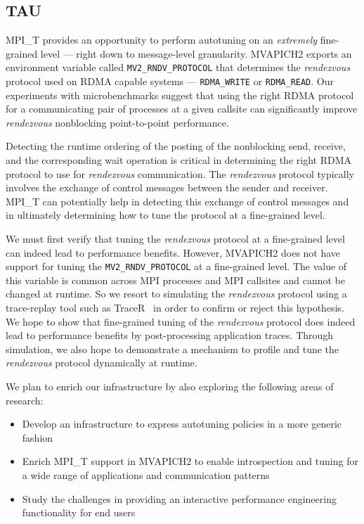 \subsection{TAU}
MPI\_T provides an opportunity to perform autotuning on an \textit{extremely} fine-grained level --- right down to message-level granularity. MVAPICH2 exports an environment variable called \verb+MV2_RNDV_PROTOCOL+ that determines the \textit{rendezvous} protocol used on RDMA capable systems --- \verb+RDMA_WRITE+ or \verb+RDMA_READ+. Our experiments with microbenchmarks suggest that using the right RDMA protocol for a communicating pair of processes at a given callsite can significantly improve \textit{rendezvous} nonblocking point-to-point performance. 
\par Detecting the runtime ordering of the posting of the nonblocking send, receive, and the corresponding wait operation is critical in determining the right RDMA protocol to use for \textit{rendezvous} communication. The \textit{rendezvous} protocol typically involves the exchange of control messages between the sender and receiver. MPI\_T can potentially help in detecting this exchange of control messages and in ultimately determining how to tune the protocol at a fine-grained level. 
\par We must first verify that tuning the \textit{rendezvous} protocol at a fine-grained level can indeed lead to performance benefits. However, MVAPICH2 does not have support for tuning the \verb+MV2_RNDV_PROTOCOL+ at a fine-grained level. The value of this variable is common across MPI processes and MPI callsites and cannot be changed at runtime. So we resort to simulating the \textit{rendezvous} protocol using a trace-replay tool such as TraceR~\cite{TraceR} in order to confirm or reject this hypothesis. We hope to show that fine-grained tuning of the \textit{rendezvous} protocol does indeed lead to performance benefits by post-processing application traces. Through simulation, we also hope to demonstrate a mechanism to profile and tune the \textit{rendezvous} protocol dynamically at runtime.
\par We plan to enrich our infrastructure by also exploring the following areas of research:
\begin{itemize}
	\item Develop an infrastructure to express autotuning policies in a more generic fashion
        \item Enrich MPI\_T support in MVAPICH2 to enable introspection and tuning for a wide range of applications and communication patterns
	\item Study the challenges in providing an interactive performance engineering functionality for end users
\end{itemize}

